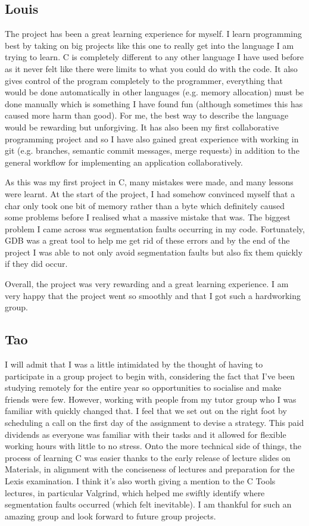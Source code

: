 \documentclass[11pt]{article}
\begin{document}
\subsection{Louis}
The project has been a great learning experience for myself. I learn programming best by taking on big projects like this one to really get into the language I am trying to learn. C is completely different to any other language I have used before as it never felt like there were limits to what you could do with the code. It also gives control of the program completely to the programmer, everything that would be done automatically in other languages (e.g. memory allocation) must be done manually which is something I have found fun (although sometimes this has caused more harm than good). For me, the best way to describe the language would be rewarding but unforgiving. It has also been my first collaborative programming project and so I have also gained great experience with working in git (e.g. branches, semantic commit messages, merge requests) in addition to the general workflow for implementing an application collaboratively.
\par
As this was my first project in C, many mistakes were made, and many lessons were learnt. At the start of the project, I had somehow convinced myself that a char only took one bit of memory rather than a byte which definitely caused some problems before I realised what a massive mistake that was. The biggest problem I came across was segmentation faults occurring in my code. Fortunately, GDB was a great tool to help me get rid of these errors and by the end of the project I was able to not only avoid segmentation faults but also fix them quickly if they did occur. 
\par
Overall, the project was very rewarding and a great learning experience. I am very happy that the project went so smoothly and that I got such a hardworking group.
\subsection{Tao}
I will admit that I was a little intimidated by the thought of having to participate in a group project to begin with, considering the fact that I've been studying remotely for the entire year so opportunities to socialise and make friends were few. However, working with people from my tutor group who I was familiar with quickly changed that. I feel that we set out on the right foot by scheduling a call on the first day of the assignment to devise a strategy. This paid dividends as everyone was familiar with their tasks and it allowed for flexible working hours with little to no stress. Onto the more technical side of things, the process of learning C was easier thanks to the early release of lecture slides on Materials, in alignment with the conciseness of lectures and preparation for the Lexis examination. I think it's also worth giving a mention to the C Tools lectures, in particular Valgrind, which helped me swiftly identify where segmentation faults occurred (which felt inevitable). I am thankful for such an amazing group and look forward to future group projects.
\end{document}
